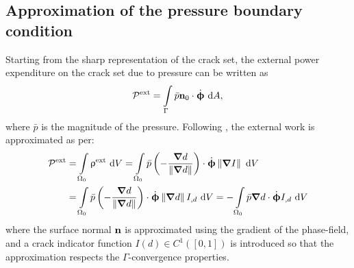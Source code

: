 \subsection{Approximation of the pressure boundary condition}
\label{section: Chapter3/theory/pressure}

Starting from the sharp representation of the crack set, the external power expenditure on the crack set due to pressure can be written as
\begin{align}
  \mathcal{P}^\text{ext} = \int\limits_{\Gamma} \bar{p}\textbf{n}_0\cdot\dot{\boldsymbol{\upphi}} \text{ d}A,
\end{align}
where $\bar{p}$ is the magnitude of the pressure. Following \cite{CHUKWUDOZIE2019957}, the external work is approximated as per:
\begin{equation}
  \begin{aligned}
    \mathcal{P}^\text{ext} & = \int\limits_{\Omega_0} \uprho^\text{ext} \text{ d}V = \int\limits_{\Omega_0} \bar{p} \left( -\dfrac{\boldsymbol{\nabla} d}{\left\lVert\boldsymbol{\nabla} d\right\rVert} \right) \cdot \dot{\boldsymbol{\upphi}} \left\lVert\boldsymbol{\nabla} I\right\rVert \text{ d}V \\
                           & = \int\limits_{\Omega_0} \bar{p} \left( -\dfrac{\boldsymbol{\nabla} d}{\left\lVert\boldsymbol{\nabla} d\right\rVert} \right) \cdot \dot{\boldsymbol{\upphi}} \left\lVert\boldsymbol{\nabla} d\right\rVert I_{,d} \text{ d}V                                             
    = - \int\limits_{\Omega_0} \bar{p} \boldsymbol{\nabla} d \cdot \dot{\boldsymbol{\upphi}} I_{,d} \text{ d}V
  \end{aligned}
  \label{eq: pressure power}
\end{equation}
where the surface normal $\textbf{n}$ is approximated using the gradient of the phase-field, and a crack indicator function $I(d) \in C^1([0,1])$ is introduced so that the approximation respects the $\Gamma$-convergence properties.

